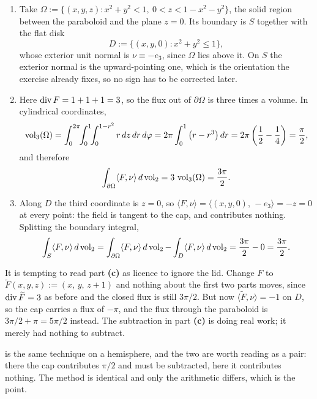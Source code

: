 \begin{exercisesolution}
\label{sol:ai_capping_a_paraboloid}
\begin{enumerate}[label=\textbf{(\alph*)}]
  \item Take $\Omega := \{(x,y,z) : x^2+y^2 < 1,\ 0 < z < 1-x^2-y^2\}$, the solid region
    between the paraboloid and the plane $z = 0$. Its boundary is $S$ together with the flat disk
    \[D := \{(x,y,0) : x^2+y^2 \leq 1\},\]
    whose exterior unit normal is $\nu \equiv -e_3$, since $\Omega$ lies above it. On $S$ the
    exterior normal is the upward-pointing one, which is the orientation the exercise already
    fixes, so no sign has to be corrected later.
  \item Here $\operatorname{div} F = 1+1+1 = 3$, so the flux out of $\partial\Omega$ is three times a
    volume. In cylindrical coordinates,
    \[\operatorname{vol}_3(\Omega) = \int_0^{2\pi}\!\!\int_0^1\!\!\int_0^{1-r^2} r\,dz\,dr\,d\varphi
      = 2\pi\int_0^1 \big(r - r^3\big)\,dr = 2\pi\left(\frac12 - \frac14\right) = \frac{\pi}{2},\]
    and therefore
    \[\int_{\partial\Omega}\langle F,\nu\rangle\,d\operatorname{vol}_2 = 3\,\operatorname{vol}_3(\Omega) = \frac{3\pi}{2}.\]
  \item Along $D$ the third coordinate is $z = 0$, so
    $\langle F,\nu\rangle = \langle (x,y,0),\,-e_3\rangle = -z = 0$ at every point: the field is
    tangent to the cap, and contributes nothing. Splitting the boundary integral,
    \[\int_S \langle F,\nu\rangle\,d\operatorname{vol}_2
      = \int_{\partial\Omega}\langle F,\nu\rangle\,d\operatorname{vol}_2 - \int_D \langle F,\nu\rangle\,d\operatorname{vol}_2
      = \frac{3\pi}{2} - 0 = \frac{3\pi}{2}.\]
\end{enumerate}

\begin{remark}
\label{rem:cap_contribution_is_not_generally_zero}
It is tempting to read part \textbf{(c)} as licence to ignore the lid. Change $F$ to
$\widetilde F(x,y,z) := (x,\,y,\,z+1)$ and nothing about the first two parts moves, since
$\operatorname{div}\widetilde F = 3$ as before and the closed flux is still $3\pi/2$. But now
$\langle \widetilde F,\nu\rangle = -1$ on $D$, so the cap carries a flux of $-\pi$, and the flux
through the paraboloid is $3\pi/2 + \pi = 5\pi/2$ instead. The subtraction in part \textbf{(c)}
is doing
real work; it merely had nothing to subtract.

 is the same technique on a hemisphere, and the two are worth reading as a pair:
there the cap contributes $\pi/2$ and must be subtracted, here it contributes nothing. The
method is identical and only the arithmetic differs, which is the point.
\end{remark}
\end{exercisesolution}

